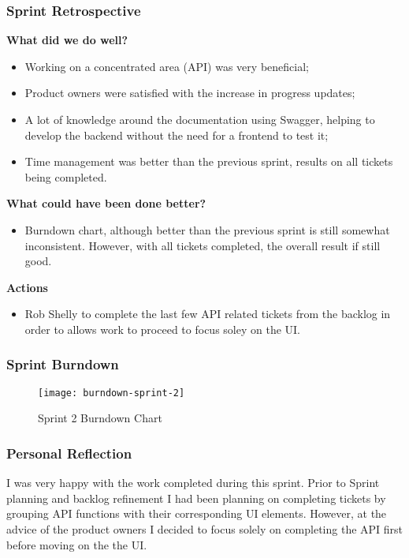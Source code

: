   \subsubsection{Sprint Retrospective}
  \textbf{What did we do well?}
  \begin{itemize}
    \item Working on a concentrated area (API) was very beneficial;
    \item Product owners were satisfied with the increase in progress updates;
    \item A lot of knowledge around the documentation using Swagger,  helping to develop the backend without the need for a frontend to test it;
    \item Time management was better than the previous sprint, results on all tickets being completed.
  \end{itemize}
  
  \noindent\textbf{What could have been done better?}
  \begin{itemize}
    \item Burndown chart, although better than the previous sprint is still somewhat inconsistent. However, with all tickets completed, the overall result if still good.
  \end{itemize}
  
  \noindent\textbf{Actions}
  \begin{itemize}
    \item Rob Shelly to complete the last few API related tickets from the backlog in order to allows work to proceed to focus soley on the UI.
  \end{itemize}
  
  \subsubsection{Sprint Burndown}
  
  \begin{figure}[H]
    \setlength{\belowcaptionskip}{15pt plus 3pt minus 2pt}
    \caption{Sprint 2 Burndown Chart}
    \centering
    \texttt{[image: burndown-sprint-2]}
    \label{fig:burndown-sprint-2}
  \end{figure}
  
  \subsubsection{Personal Reflection}
  I was very happy with the work completed during this sprint. Prior to Sprint planning and backlog refinement I had been planning on completing tickets by grouping API functions with their corresponding UI elements. However, at the advice of the product owners I decided to focus solely on completing the API first before moving on the the UI.
  

